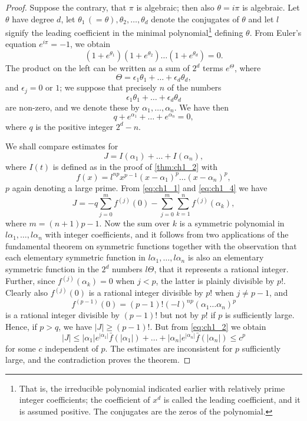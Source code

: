 \begin{proof}
Suppose the contrary, that $\pi$ is algebraic; then also $\theta = i\pi$ is algebraic. Let $\theta$ have degree $d$, let $\theta_1 \,(=\theta), \theta_2, \dots, \theta_d$ denote the conjugates of $\theta$ and let $l$ signify the leading coefficient in the minimal polynomial\footnote{That is, the irreducible polynomial indicated earlier with relatively prime integer coefficients; the coefficient of $x^d$ is called the leading coefficient, and it is assumed positive. The conjugates are the zeros of the polynomial.} defining $\theta$. From Euler's equation $e^{i\pi} = -1$, we obtain
\[
(1+e^{\theta_1})(1+e^{\theta_2})\dots(1+e^{\theta_d})=0.
\]
The product on the left can be written as a sum of $2^d$ terms $e^{\Theta}$, where
\[
\Theta = \epsilon_1 \theta_1 + \dots + \epsilon_d \theta_d,
\]
and $\epsilon_j = 0$ or $1$; we suppose that precisely $n$ of the numbers
\[
\epsilon_1 \theta_1 + \dots + \epsilon_d \theta_d
\]
are non-zero, and we denote these by $\alpha_1, \dots, \alpha_n$. We have then
\begin{equation} \label{eq:ch1_4}\tag{4}
q + e^{\alpha_1} + \dots + e^{\alpha_n} = 0,
\end{equation}
where $q$ is the positive integer $2^d - n$.

We shall compare estimates for
\[
J = I(\alpha_1) + \dots + I(\alpha_n),
\]
where $I(t)$ is defined as in the proof of \autoref{thm:ch1_2} with
\[
f(x) = l^{np} x^{p-1} (x-\alpha_1)^p \dots (x-\alpha_n)^p,
\]
$p$ again denoting a large prime. From \eqref{eq:ch1_1} and \eqref{eq:ch1_4} we have
\[
J = -q \sum_{j=0}^{m} f^{(j)}(0) - \sum_{j=0}^{m} \sum_{k=1}^{n} f^{(j)}(\alpha_k),
\]
where $m = (n+1)p - 1$. Now the sum over $k$ is a symmetric polynomial in $l\alpha_1, \dots, l\alpha_n$ with integer coefficients, and it follows from two applications of the fundamental theorem on symmetric functions together with the observation that each elementary symmetric function in $l\alpha_1, \dots, l\alpha_n$ is also an elementary symmetric function in the $2^d$ numbers $l\Theta$, that it represents a rational integer. Further, since $f^{(j)}(\alpha_k)=0$ when $j < p$, the latter is plainly divisible by $p!$. Clearly also $f^{(j)}(0)$ is a rational integer divisible by $p!$ when $j \neq p-1$, and
\[
f^{(p-1)}(0) = (p-1)! (-l)^{np} (\alpha_1 \dots \alpha_n)^p
\]
is a rational integer divisible by $(p-1)!$ but not by $p!$ if $p$ is sufficiently large. Hence, if $p > q$, we have $|J| \ge (p-1)!$. But from \eqref{eq:ch1_2} we obtain
\[
|J| \le |\alpha_1| e^{|\alpha_1|} \bar{f}(|\alpha_1|) + \dots + |\alpha_n| e^{|\alpha_n|} \bar{f}(|\alpha_n|) \le c^p
\]
for some $c$ independent of $p$. The estimates are inconsistent for $p$ sufficiently large, and the contradiction proves the theorem.
\end{proof}


